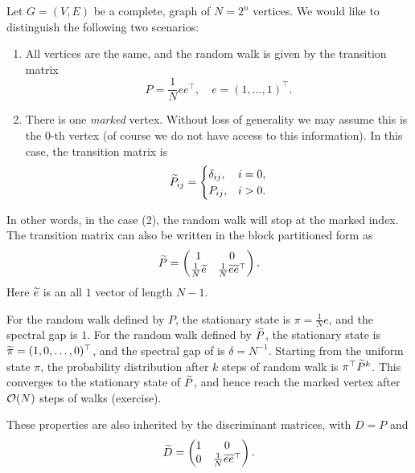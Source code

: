 \begin{exam}
Let $G=(V,E)$ be a complete,  graph of $N=2^n$ vertices. We would like to distinguish the following two scenarios:
\begin{enumerate}

\item All vertices are the same, and the random walk is given by the transition matrix
\begin{equation}
P=\frac{1}{N} e e^{\top}, \quad e=(1,\ldots,1)^{\top}.
\end{equation} 

\item There is one \textit{marked} vertex. Without loss of generality we may assume this is the $0$-th vertex (of course we do not have access to this information). 
In this case, the transition matrix is
\begin{equation}
\widetilde{P}_{ij}=\begin{cases}
\delta_{ij}, & i=0,\\
P_{ij}, & i>0.
\end{cases}
\end{equation} 
\end{enumerate}
In other words, in the case (2), the random walk will stop at the marked index.
The transition matrix can also be written in the block partitioned form as
\begin{equation}
\widetilde{P}=\begin{pmatrix}
1 & 0\\
\frac{1}{N} \widetilde{e} & \frac{1}{N} \widetilde{e}\widetilde{e}^{\top}
\end{pmatrix}.
\end{equation}
Here $\widetilde{e}$ is an all $1$ vector of length $N-1$. 

For the random walk defined by $P$, the stationary state is $\pi=\frac{1}{N}e$, and the spectral gap is $1$. For the random walk defined by $\widetilde{P}$, the stationary state is $\widetilde{\pi}=(1,0,\ldots,0)^{\top}$, and the spectral gap of is $\delta=N^{-1}$. Starting from the uniform state $\pi$, the probability distribution after $k$ steps of random walk is $\pi^{\top}\widetilde{P}^{k}$. 
This converges to the stationary state of $\widetilde{P}$, and hence reach the marked vertex after $\mathcal{O}(N)$ steps of walks (exercise).

These properties are also inherited by the discriminant matrices, with $D=P$ and 
\begin{equation}
\widetilde{D}=\begin{pmatrix}
1 & 0\\
0 & \frac{1}{N} \widetilde{e}\widetilde{e}^{\top}
\end{pmatrix}.
\end{equation}


\end{exam}
